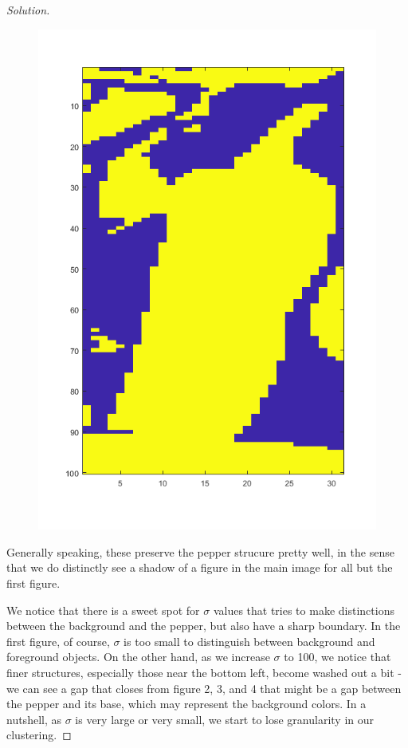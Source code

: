 \documentclass[10pt]{article}
\begin{document}
\begin{proof}[Solution]
\begin{figure}[H]
\begin{minipage}{.5\textwidth}
  \includegraphics[width=\linewidth]{pepper_sigma_10}
  \label{fig:test2}
\end{minipage}
\end{figure}

Generally speaking, these preserve the pepper strucure pretty well, in the sense that we do distinctly see a shadow of a figure in the main image for all but the first figure.

We notice that there is a sweet spot for $\sigma$ values that tries to make distinctions between the background and the pepper, but also have a sharp boundary. In the first figure, of course, $\sigma$ is too small to distinguish between background and foreground objects. On the other hand, as we increase $\sigma$ to 100, we notice that finer structures, especially those near the bottom left, become washed out a bit - we can see a gap that closes from figure 2, 3, and 4 that might be a gap between the pepper and its base, which may represent the background colors. In a nutshell, as $\sigma$ is very large or very small, we start to lose granularity in our clustering.


\end{proof}
\end{document}
